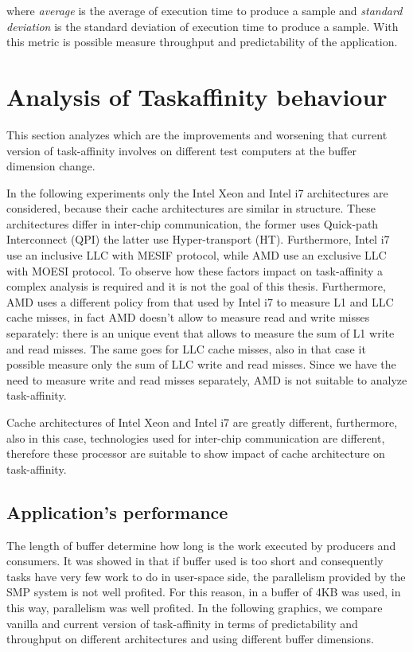 where \textit{average} is the average of execution time to produce a sample and \textit{standard deviation} is the standard deviation of execution time to 
produce a sample. With this metric is possible measure throughput and predictability of the application.

\section{Analysis of Taskaffinity behaviour}

This section analyzes which are the improvements and worsening that current version of task-affinity involves on different test computers at the buffer 
dimension change.

In the following experiments only the Intel Xeon and Intel i7 architectures are considered, because their cache architectures are similar in structure.
These architectures differ in inter-chip communication, the former uses Quick-path Interconnect (QPI) the latter use Hyper-transport (HT). 
Furthermore, Intel i7 use an inclusive LLC with MESIF protocol, while AMD use an exclusive LLC with MOESI protocol. To observe how these factors impact 
on task-affinity a complex analysis is required and it is not the goal of this thesis. Furthermore, AMD uses a different policy from that used by Intel i7
to measure L1 and LLC cache misses, in fact AMD doesn't allow to measure read and write misses separately: there is an unique event that allows to measure 
the sum of L1 write and read misses. The same goes for LLC cache misses, also in that case it possible measure only the sum of LLC write and read misses.
Since we have the need to measure write and read misses separately, AMD is not suitable to analyze task-affinity.

Cache architectures of Intel Xeon and Intel i7 are greatly different, furthermore, also in this case, technologies used for inter-chip communication are 
different, therefore these processor are suitable to show impact of cache architecture on task-affinity.

\subsection{Application's performance}

The length of buffer determine how long is the work executed by producers and consumers. It was showed in \cite{lcs} that if buffer used is too short and 
consequently tasks have very few work to do in user-space side, the parallelism provided by the SMP system is not well profited. For this reason, in 
\cite{lcs} a buffer of 4KB was used, in this way, parallelism was well profited. In the following graphics, we compare vanilla and current version 
of task-affinity in terms of predictability and throughput on different architectures and using different buffer dimensions.

